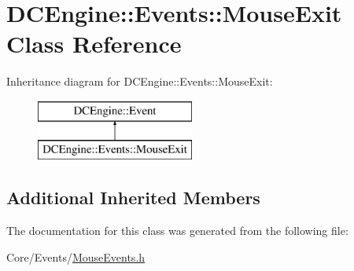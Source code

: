 \hypertarget{classDCEngine_1_1Events_1_1MouseExit}{\section{D\-C\-Engine\-:\-:Events\-:\-:Mouse\-Exit Class Reference}
\label{classDCEngine_1_1Events_1_1MouseExit}
}
Inheritance diagram for D\-C\-Engine\-:\-:Events\-:\-:Mouse\-Exit\-:\begin{figure}[H]
\begin{center}
\leavevmode
\includegraphics[height=2.000000cm]{classDCEngine_1_1Events_1_1MouseExit}
\end{center}
\end{figure}
\subsection*{Additional Inherited Members}


The documentation for this class was generated from the following file\-:\begin{DoxyCompactItemize}
\item 
Core/\-Events/\hyperlink{MouseEvents_8h}{Mouse\-Events.\-h}\end{DoxyCompactItemize}
